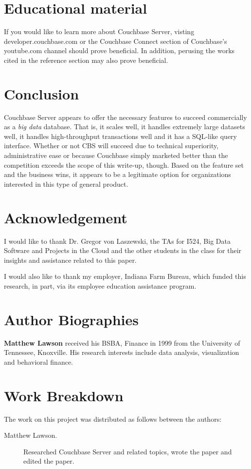 \documentclass[9pt,twocolumn,twoside]{styles/osajnl}
\begin{document}
\section{Educational material}
If you would like to learn more about Couchbase Server, visting developer.couchbase.com or the Couchbase Connect section of Couchbase's youtube.com channel should prove beneficial.  In addition, perusing the works cited in the reference section may also prove beneficial.

\section{Conclusion}

Couchbase Server appears to offer the necessary features to succeed commercially as a \textit{big data} database.  That is, it scales well, it handles extremely large datasets well, it handles high-throughput transactions well and it has a SQL-like query interface.  Whether or not CBS will succeed due to technical superiority, administrative ease or because Couchbase simply marketed better than the competition exceeds the scope of this write-up, though.  Based on the feature set and the business wins, it appears to be a legitimate option for organizations interested in this type of general product.

\section{Acknowledgement}

I would like to thank Dr. Gregor von Laszewski, the TAs for I524, Big Data Software and Projects in the Cloud and the other students in the class for their insights and assistance related to this paper.

I would also like to thank my employer, Indiana Farm Bureau, which funded this research, in part, via its employee education assistance program.



 
\section*{Author Biographies}
\begingroup
\setlength\intextsep{0pt}
\begin{minipage}[t][3.2cm][t]{1.0\columnwidth} %
  \noindent
  {\bfseries Matthew Lawson} received his BSBA, Finance in 1999 from
  the University of Tennessee, Knoxville. His research interests include
  data analysis, visualization and behavioral finance.
\end{minipage}
\endgroup


\appendix

\section{Work Breakdown}

The work on this project was distributed as follows between the
authors:

\begin{description}
\item[Matthew Lawson.] Researched Couchbase Server and related topics, wrote the paper and edited the paper.
\end{description}
\end{document}
